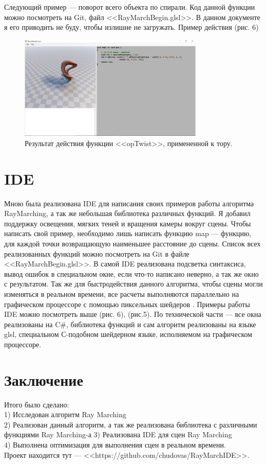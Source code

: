 \documentclass[14pt]{matmex-diploma}
\begin{document}
Следующий пример --- поворот всего объекта по спирали. Код данной функции можно посмотреть на Git, файл <<RayMarchBegin.glsl>>. В данном документе я его приводить не буду, 
чтобы излишне не загружать. Пример действия (рис. 6)

\begin{figure}[h]
\label{twist}
\centering
\includegraphics[width = 250pt]{prim1.png}
\caption{Результат действия функции <<opTwist>>, примененной к тору.}
\end{figure}

\section{IDE}
Мною была реализована IDE для написания своих примеров работы алгоритма RayMarching, а так же небольшая библиотека различных функций. Я добавил поддержку освещения,
мягких теней и вращения камеры вокруг сцены. Чтобы написать свой пример, необходимо лишь написать функцию map --- функцию, для каждой точки возвращающую
наименьшее расстояние до сцены. Список всех реализованных функций можно посмотреть на Git в файле <<RayMarchBegin.glsl>>.
В самой IDE реализована подсветка синтаксиса, вывод ошибок в специальном окне, если что-то написано неверно, а так же окно с результатом.
Так же для быстродействия данного алгоритма, чтобы сцены могли изменяться в реальном времени, все расчеты выполняются параллельно на графическом процессоре с 
помощью пиксельных шейдеров \cite{wiki:shader}. Примеры работы IDE можно посмотреть выше (рис. 6), (рис.5).
По технической части --- все окна реализованы на C\#, библиотека функций и сам алгоритм реализованы на языке glsl, специальном С-подобном шейдерном языке, исполняемом
на графическом процессоре. 

\section*{Заключение}

Итого было сделано: \\
1) Исследован алгоритм Ray Marching \\
2) Реализован данный алгоритм, а так же реализована библиотека с различными функциями Ray Marching-а
3) Реализована IDE для сцен Ray Marching \\
4) Выполнена оптимизация для выполнения сцен в реальном времени. \\

Проект находится тут --- <<https://github.com/chudovas/RayMarchIDE>>. 

\setmonofont[Mapping=tex-text]{CMU Typewriter Text}


\end{document}
